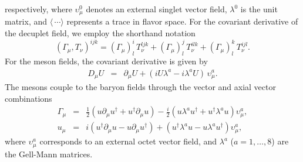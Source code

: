 \documentclass[preprintnumbers,prd,superscriptaddress,preprint]{revtex4-1}
\begin{document}
%
respectively, where $\upsilon_\mu^0$ denotes an external singlet vector field, $\lambda^0$ is the unit matrix, and $\langle\, \cdots \rangle$ represents a trace in flavor space.
For the covariant derivative of the decuplet field, we employ the shorthand notation
%
\begin{equation}
(\Gamma_\mu, T_\nu)^{ijk}
= (\Gamma_\mu)_l^i\, T_\nu^{ljk}
+ (\Gamma_\mu)_l^j\, T_\nu^{ilk}
+ (\Gamma_\mu)_l^k\, T_\nu^{ijl}.
\end{equation}
%
For the meson fields, the covariant derivative is given by
%
\begin{eqnarray}
D_\mu U
&=& \partial_\mu U
 + (iU \lambda^a - i \lambda^a U)\, \upsilon_\mu^a.
\end{eqnarray}
%
The mesons couple to the baryon fields through the vector and axial vector combinations
%
\begin{eqnarray}
\Gamma_\mu
&=& \frac12
    \left( u \partial_\mu u^\dagger + u^\dagger \partial_\mu u \right)
 -  \frac{i}{2}
    \left( u \lambda^a u^\dagger + u^\dagger \lambda^a u \right) \upsilon_\mu^a,
\\
%
  u_\mu
&=& i
    \left( u^\dagger \partial_\mu u - u \partial_\mu u^\dagger \right)
 +  \left( u^\dagger \lambda^a u - u \lambda^a u^\dagger \right) \upsilon_\mu^a,
\label{eq:22}
\end{eqnarray}
%
where $\upsilon_\mu^a$ corresponds to an external octet vector field,
and $\lambda^a$ ($a=1, \ldots, 8$) are the Gell-Mann matrices.
\end{document}
